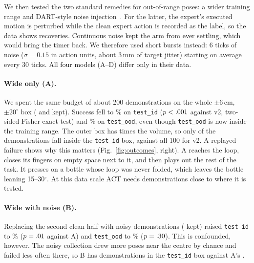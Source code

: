 \documentclass[10pt,twocolumn,letterpaper]{article}
\newcommand{\ttt}[1]{\texttt{\small #1}}
\begin{document}
We then tested the two standard remedies for out-of-range poses: a wider training range and DART-style noise
injection~\cite{dart}. For the latter, the expert's executed motion is perturbed while the clean expert action
is recorded as the label, so the data shows recoveries. Continuous noise kept the arm from ever settling, which
would bring the timer back. We therefore used short bursts instead: 6 ticks of noise ($\sigma=0.15$ in action
units, about 3\,mm of target jitter) starting on average every 30 ticks. All four models (A--D) differ only in
their data.

\paragraph{Wide only (A).} We spent the same budget of about 200 demonstrations on the whole $\pm6$\,cm,
$\pm20^\circ$ box (\CollWideA{} and \CollWideB{} kept). Success fell to \AId\% on \ttt{test\_id}
($p < .001$ against v2, two-sided Fisher exact test) and \AOod\% on \ttt{test\_ood}, even though
\ttt{test\_ood} is now inside the training range. The outer box has \WideVolume{} times the volume, so only
\AInBox{} of the \ADemos{} demonstrations fall inside the \ttt{test\_id} box, against all 100 for v2. A
replayed failure shows why this matters (Fig.~\ref{fig:outcomes}, right). A reaches the loop, closes its
fingers on empty space next to it, and then plays out the rest of the task. It presses on a bottle whose loop
was never folded, which leaves the bottle leaning 15--30$^\circ$. At this data scale ACT needs demonstrations
close to where it is tested.

\paragraph{Wide with noise (B).} Replacing the second clean half with noisy demonstrations (\CollNoise{} kept)
raised \ttt{test\_id} to \BId\% ($p = .01$ against A) and \ttt{test\_ood} to \BOod\% ($p
= .30$). This is confounded, however. The noisy collection drew more poses near the centre by chance
and failed less often there, so B has \BInBox{} demonstrations in the \ttt{test\_id} box against A's \AInBox.
\end{document}

